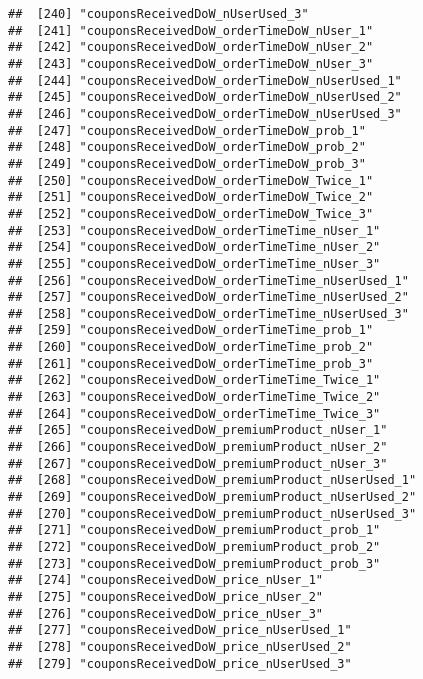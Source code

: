 \documentclass[10pt]{report}
\begin{document}
\begin{verbatim}
##  [240] "couponsReceivedDoW_nUserUsed_3"                       
##  [241] "couponsReceivedDoW_orderTimeDoW_nUser_1"              
##  [242] "couponsReceivedDoW_orderTimeDoW_nUser_2"              
##  [243] "couponsReceivedDoW_orderTimeDoW_nUser_3"              
##  [244] "couponsReceivedDoW_orderTimeDoW_nUserUsed_1"          
##  [245] "couponsReceivedDoW_orderTimeDoW_nUserUsed_2"          
##  [246] "couponsReceivedDoW_orderTimeDoW_nUserUsed_3"          
##  [247] "couponsReceivedDoW_orderTimeDoW_prob_1"               
##  [248] "couponsReceivedDoW_orderTimeDoW_prob_2"               
##  [249] "couponsReceivedDoW_orderTimeDoW_prob_3"               
##  [250] "couponsReceivedDoW_orderTimeDoW_Twice_1"              
##  [251] "couponsReceivedDoW_orderTimeDoW_Twice_2"              
##  [252] "couponsReceivedDoW_orderTimeDoW_Twice_3"              
##  [253] "couponsReceivedDoW_orderTimeTime_nUser_1"             
##  [254] "couponsReceivedDoW_orderTimeTime_nUser_2"             
##  [255] "couponsReceivedDoW_orderTimeTime_nUser_3"             
##  [256] "couponsReceivedDoW_orderTimeTime_nUserUsed_1"         
##  [257] "couponsReceivedDoW_orderTimeTime_nUserUsed_2"         
##  [258] "couponsReceivedDoW_orderTimeTime_nUserUsed_3"         
##  [259] "couponsReceivedDoW_orderTimeTime_prob_1"              
##  [260] "couponsReceivedDoW_orderTimeTime_prob_2"              
##  [261] "couponsReceivedDoW_orderTimeTime_prob_3"              
##  [262] "couponsReceivedDoW_orderTimeTime_Twice_1"             
##  [263] "couponsReceivedDoW_orderTimeTime_Twice_2"             
##  [264] "couponsReceivedDoW_orderTimeTime_Twice_3"             
##  [265] "couponsReceivedDoW_premiumProduct_nUser_1"            
##  [266] "couponsReceivedDoW_premiumProduct_nUser_2"            
##  [267] "couponsReceivedDoW_premiumProduct_nUser_3"            
##  [268] "couponsReceivedDoW_premiumProduct_nUserUsed_1"        
##  [269] "couponsReceivedDoW_premiumProduct_nUserUsed_2"        
##  [270] "couponsReceivedDoW_premiumProduct_nUserUsed_3"        
##  [271] "couponsReceivedDoW_premiumProduct_prob_1"             
##  [272] "couponsReceivedDoW_premiumProduct_prob_2"             
##  [273] "couponsReceivedDoW_premiumProduct_prob_3"             
##  [274] "couponsReceivedDoW_price_nUser_1"                     
##  [275] "couponsReceivedDoW_price_nUser_2"                     
##  [276] "couponsReceivedDoW_price_nUser_3"                     
##  [277] "couponsReceivedDoW_price_nUserUsed_1"                 
##  [278] "couponsReceivedDoW_price_nUserUsed_2"                 
##  [279] "couponsReceivedDoW_price_nUserUsed_3"                 

\end{verbatim}
\end{document}
